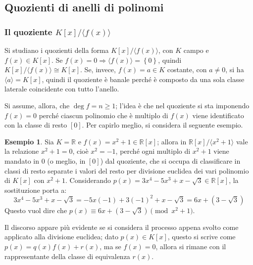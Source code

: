 \documentclass[11pt, a4paper]{scrartcl}
\theoremstyle{definition}
\newtheorem{esempio}{Esempio}
\numberwithin{esempio}{section}
\theoremstyle{definition}
\numberwithin{obs}{section}
\numberwithin{nota}{section}
\numberwithin{equation}{subsection}
\begin{document}
\subsection{Quozienti di anelli di polinomi}
\subsubsection{Il quoziente $K[x] / \langle f(x) \rangle$}
Si studiano i quozienti della forma $K[x] / \langle f(x) \rangle$, con $K$ campo e $f(x) \in K[x]$.
Se $f(x) = 0 \Rightarrow \langle f(x) \rangle= \left\{ 0 \right\} $, quindi $K[x] / \langle f(x) \rangle \cong K[x]$.
Se, invece, $f(x) = a \in K$ costante, con $a \neq 0$, si ha $\langle a \rangle = K[x]$, quindi il quoziente \`e banale perch\'e \`e composto da una sola classe laterale coincidente con tutto l'anello.

Si assume, allora, che $\operatorname{deg} f = n \ge 1$; l'idea \`e che nel quoziente si sta imponendo $f(x) = 0$ perch\'e ciascun polinomio che \`e multiplo di $f(x)$ viene identificato con la classe di resto $[0]$.
Per capirlo meglio, si considera il seguente esempio.
\begin{esempio}
	Sia $K = \mathbb{R}$ e $f(x) = x^2 + 1 \in  \mathbb{R}[x]$; allora in $\mathbb{R}[x] / \langle x^2 + 1 \rangle $ vale la relazione $x^2 + 1 = 0$, cio\`e $x^2 = - 1$, perch\'e ogni multiplo di $x^2 + 1$ viene mandato in $0$ (o meglio, in $[0]$) dal quoziente, che si occupa di classificare in classi di resto separate i valori del resto per divisione euclidea dei vari polinomio di $K[x]$ con $x^2 + 1$.
	Considerando $p(x)=3x^4 - 5x^3 + x -\sqrt{3} \in \mathbb{R}[x]$, la sostituzione porta a:
	\[
	3x^4 - 5x^3 + x -\sqrt{3}  = -5x (-1) + 3 (-1)^2 + x - \sqrt{3}= 6x + (3 - \sqrt{3}) 
	\] 
	Questo vuol dire che $p(x) \equiv 6x + (3-\sqrt{3} ) \pmod{x^2 +1 } $.
\end{esempio}
\noindent Il discorso appare pi\`u evidente se si considera il processo appena svolto come applicato alla divisione euclidea; dato $p(x) \in K[x]$, questo si scrive come $p(x) = q(x) f(x) + r(x)$, ma se $f(x) = 0$, allora si rimane con il rappresentante della classe di equivalenza $r(x)$.
\end{document}
